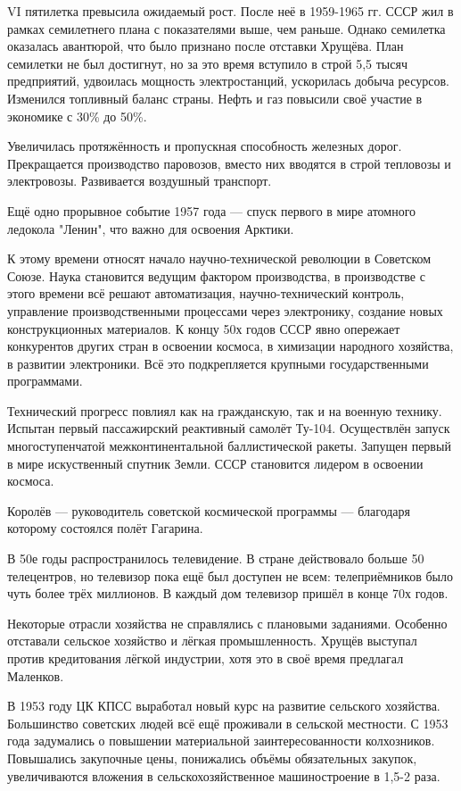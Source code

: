 \documentclass{article}
\begin{document}
VI пятилетка превысила ожидаемый рост. После неё в 1959-1965 гг. СССР жил в рамках семилетнего плана с показателями выше, чем раньше. Однако семилетка оказалась авантюрой, что было признано после отставки Хрущёва. План семилетки не был достигнут, но за это время вступило в строй 5,5 тысяч предприятий, удвоилась мощность электростанций, ускорилась добыча ресурсов. Изменился топливный баланс страны. Нефть и газ повысили своё участие в экономике с 30\% до 50\%.

Увеличилась протяжённость и пропускная способность железных дорог. Прекращается производство паровозов, вместо них вводятся в строй тепловозы и электровозы. Развивается воздушный транспорт.

Ещё одно прорывное событие 1957 года --- спуск первого в мире атомного ледокола "Ленин", что важно для освоения Арктики.

К этому времени относят начало научно-технической революции в Советском Союзе. Наука становится ведущим фактором производства, в производстве с этого времени всё решают автоматизация, научно-технический контроль, управление производственными процессами через электронику, создание новых конструкционных материалов. К концу 50х годов СССР явно опережает конкурентов других стран в освоении космоса, в химизации народного хозяйства, в развитии электроники. Всё это подкрепляется крупными государственными программами.

Технический прогресс повлиял как на гражданскую, так и на военную технику. Испытан первый пассажирский реактивный самолёт Ту-104. Осуществлён запуск многоступенчатой межконтинентальной баллистической ракеты. Запущен первый в мире искуственный спутник Земли. СССР становится лидером в освоении космоса.

Королёв --- руководитель советской космической программы --- благодаря которому состоялся полёт Гагарина.

В 50е годы распространилось телевидение. В стране действовало больше 50 телецентров, но телевизор пока ещё был доступен не всем: телеприёмников было чуть более трёх миллионов. В каждый дом телевизор пришёл в конце 70х годов.

Некоторые отрасли хозяйства не справлялись с плановыми заданиями. Особенно отставали сельское хозяйство и лёгкая промышленность. Хрущёв выступал против кредитования лёгкой индустрии, хотя это в своё время предлагал Маленков.

В 1953 году ЦК КПСС выработал новый курс на развитие сельского хозяйства. Большинство советских людей всё ещё проживали в сельской местности. С 1953 года задумались о повышении материальной заинтересованности колхозников. Повышались закупочные цены, понижались объёмы обязательных закупок, увеличиваются вложения в сельскохозяйственное машиностроение в 1,5-2 раза.
\end{document}
